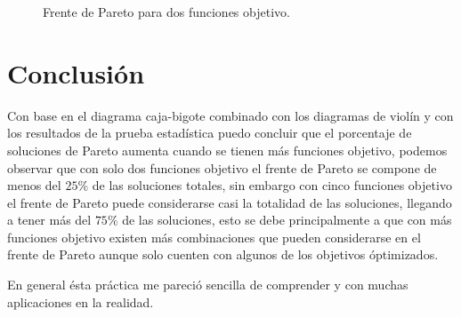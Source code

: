 \documentclass{article}
\begin{document}
\begin{figure}[h!]
\centering
{}
\caption{Frente de Pareto para dos funciones objetivo.} 
\label{f1}
\end{figure}

\newpage
\section{Conclusi\'{o}n}
Con base en el diagrama caja-bigote combinado con los diagramas de violín y con los resultados de la prueba estadística puedo concluir que el porcentaje de soluciones de Pareto aumenta cuando se tienen más funciones objetivo, podemos observar que con solo dos funciones objetivo el frente de Pareto se compone de menos del $25\%$ de las soluciones totales, sin embargo con cinco funciones objetivo el frente de Pareto puede considerarse casi la totalidad de las soluciones, llegando a tener más del $75\%$ de las soluciones, esto se debe principalmente a que con más funciones objetivo existen más combinaciones que pueden considerarse en el frente de Pareto aunque solo cuenten con algunos de los objetivos óptimizados.
\smallskip

En general ésta práctica me pareció sencilla de comprender y con muchas aplicaciones en la realidad.
\newpage



\end{document}

